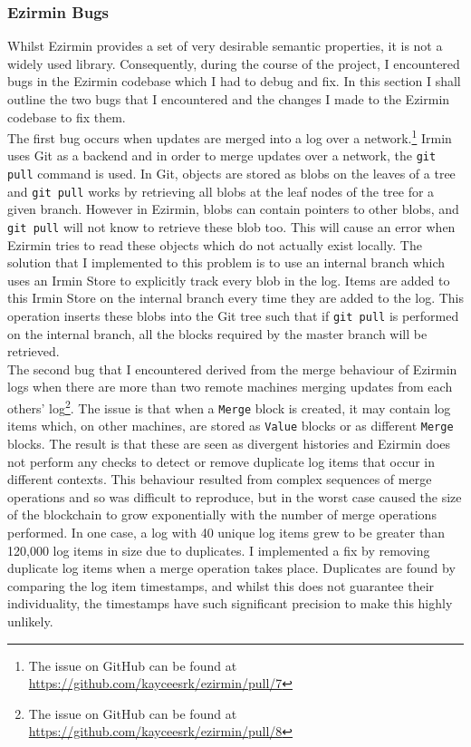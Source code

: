 \documentclass[12pt,a4paper,twoside,openright]{report}
\begin{document}
	\subsubsection*{Ezirmin Bugs}
	Whilst Ezirmin provides a set of very desirable semantic properties, it is not a widely used library. 
	Consequently, during the course of the project, I encountered bugs in the Ezirmin codebase which I had to debug and fix.
	In this section I shall outline the two bugs that I encountered and the changes I made to the Ezirmin codebase to fix them.\\
	
	The first bug occurs when updates are merged into a log over a network.\footnote{The issue on GitHub can be found at \href{https://github.com/kayceesrk/ezirmin/pull/7}{https://github.com/kayceesrk/ezirmin/pull/7}}
	Irmin uses Git as a backend and in order to merge updates over a network, the \texttt{git pull} command is used.
	In Git, objects are stored as blobs on the leaves of a tree and \texttt{git pull} works by retrieving all blobs at the leaf nodes of the tree for a given branch.
	However in Ezirmin, blobs can contain pointers to other blobs, and \texttt{git pull} will not know to retrieve these blob too.
	This will cause an error when Ezirmin tries to read these objects which do not actually exist locally. 
	The solution that I implemented to this problem is to use an internal branch which uses an Irmin Store to explicitly track every blob in the log.
	Items are added to this Irmin Store on the internal branch every time they are added to the log.
	This operation inserts these blobs into the Git tree such that if \texttt{git pull} is performed on the internal branch, all the blocks required by the master branch will be retrieved.\\

	The second bug that I encountered derived from the merge behaviour of Ezirmin logs when there are more than two remote machines merging updates from each others' log\footnote{The issue on GitHub can be found at \href{https://github.com/kayceesrk/ezirmin/pull/8}{https://github.com/kayceesrk/ezirmin/pull/8}}.
	The issue is that when a \texttt{Merge} block is created, it may contain log items which, on other machines, are stored as \texttt{Value} blocks or as different \texttt{Merge} blocks.
	The result is that these are seen as divergent histories and Ezirmin does not perform any checks to detect or remove duplicate log items that occur in different contexts.
	This behaviour resulted from complex sequences of merge operations and so was difficult to reproduce, but in the worst case caused the size of the blockchain to grow exponentially with the number of merge operations performed.
	In one case, a log with 40 unique log items grew to be greater than 120,000 log items in size due to duplicates.
	I implemented a fix by removing duplicate log items when a merge operation takes place. 
	Duplicates are found by comparing the log item timestamps, and whilst this does not guarantee their individuality, the timestamps have such significant precision to make this highly unlikely.
\end{document}
